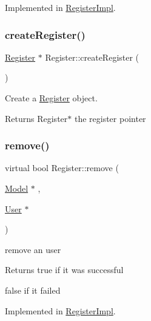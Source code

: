 Implemented in \hyperlink{classRegisterImpl_af0463a5627b02b797a4a9d5d90f55a46}{Register\+Impl}.

\mbox{\label{classRegister_ae94e883032b0a13d28e1fba375894fb6}} 
\subsubsection{\texorpdfstring{create\+Register()}{createRegister()}}
{\footnotesize\ttfamily \hyperlink{classRegister}{Register} $\ast$ Register\+::create\+Register (\begin{DoxyParamCaption}{ }\end{DoxyParamCaption})\hspace{0.3cm}{\ttfamily [static]}}



Create a \hyperlink{classRegister}{Register} object. 

\begin{DoxyReturn}{Returns}
Register$\ast$ the register pointer 
\end{DoxyReturn}
\mbox{\label{classRegister_a09d7d6c24f7c07e97f7ef2d24a057f73}} 
\subsubsection{\texorpdfstring{remove()}{remove()}}
{\footnotesize\ttfamily virtual bool Register\+::remove (\begin{DoxyParamCaption}\item[{\hyperlink{classModel}{Model} $\ast$}]{,  }\item[{\hyperlink{classUser}{User} $\ast$}]{ }\end{DoxyParamCaption})\hspace{0.3cm}{\ttfamily [pure virtual]}}



remove an user 

\begin{DoxyReturn}{Returns}
true if it was successful 

false if it failed 
\end{DoxyReturn}


Implemented in \hyperlink{classRegisterImpl_a528ea874f5607abfea9fea4b8cab1628}{Register\+Impl}.

